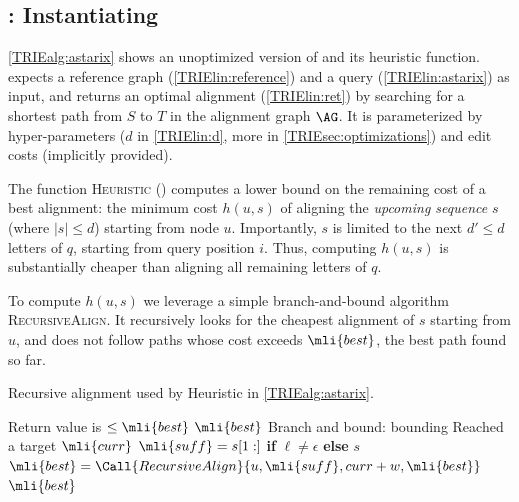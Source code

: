 


\subsection{\astarix: Instantiating \A} \label{TRIEsubsec:astarix-heuristic}
\cref{TRIEalg:astarix} shows an unoptimized version of \astarix and its heuristic
function.
%
\astarix expects a reference graph (\cref{TRIElin:reference}) and a query
(\cref{TRIElin:astarix}) as input, and returns an optimal alignment (\cref{TRIElin:ret})
by searching for a shortest path from $S$ to $T$ in the alignment graph $\AG$.
It is parameterized by hyper-parameters ($d$ in \cref{TRIElin:d}, more in
\cref{TRIEsec:optimizations}) and edit costs (implicitly provided).

The function \textsc{Heuristic}
() computes a lower bound on
the remaining cost of a best alignment: the minimum cost $h(u,s)$ of aligning
the \emph{upcoming sequence} $s$ (where $\lvert s \rvert \leq d$) starting from
node $u$. Importantly, $s$ is limited to the next $d' \leq d$ letters of $q$,
starting from query position $i$. Thus, computing $h(u,s)$ is substantially
cheaper than aligning all remaining letters of $q$.

To compute $h(u,s)$ we leverage a simple branch-and-bound algorithm
\textsc{RecursiveAlign}. It recursively looks for the cheapest alignment of $s$
starting from $u$, and does not follow paths whose cost exceeds $\mli{best}$,
the best path found so far.

\begin{algorithm}[t]
	\caption{Recursive alignment used by Heuristic in \cref{TRIEalg:astarix}.}\label{TRIEalg:recursiveAlign}
	\begin{algorithmic}[1]
		\Statex
			 \Comment
			Return value is $\leq \mli{best}$
				\State \Return $\mli{best}$
				\Comment Branch and bound: bounding
			\EndIf
				\Comment Reached a target
				\State \Return $\mli{curr}$
			\EndIf
				\State $\mli{suff} = s[1:]$ \textbf{if} $\ell \neq \epsilon$ \textbf{else} $s$
				\State $\mli{best} = \Call{RecursiveAlign}{u, \mli{suff}, curr + w, \mli{best}}$
			\EndFor
			\State \Return $\mli{best}$
		\EndFunction
	\end{algorithmic}
\end{algorithm}

